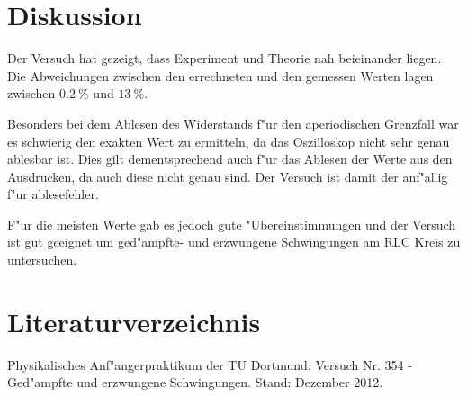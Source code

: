 \newpage
\section{Diskussion}
	\label{sec:diskussion}

	Der Versuch hat gezeigt, dass Experiment und Theorie nah beieinander liegen.
	Die Abweichungen zwischen den errechneten und den gemessen Werten lagen zwischen $\SI{0.2}{\%}$ und $\SI{13}{\%}$.

	Besonders bei dem Ablesen des Widerstands f"ur den aperiodischen Grenzfall war es schwierig den exakten Wert zu ermitteln, da das Oszilloskop nicht sehr genau ablesbar ist.
	Dies gilt dementsprechend auch f"ur das Ablesen der Werte aus den Ausdrucken, da auch diese nicht genau sind.
	Der Versuch ist damit der anf"allig f"ur ablesefehler.

	F"ur die meisten Werte gab es jedoch gute "Ubereinstimmungen und der Versuch ist gut geeignet um ged"ampfte- und erzwungene Schwingungen am RLC Kreis zu untersuchen.

\section{Literaturverzeichnis}
	\label{sec:literaturverzeichnis}

	\begin{thebibliography}{9}
		 Physikalisches Anf"angerpraktikum der TU Dortmund: Versuch Nr. 354 - Ged"ampfte und erzwungene Schwingungen. Stand: Dezember 2012.
	\end{thebibliography}
